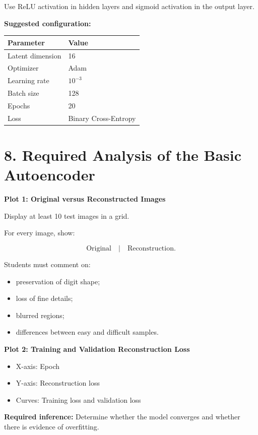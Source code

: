 \documentclass[10pt]{article}
\begin{document}
Use ReLU activation in hidden layers and sigmoid activation in the output
layer.

\textbf{Suggested configuration:}

\begin{center}
\begin{tabular}{|l|l|}
\hline
Parameter & Value\\
\hline
Latent dimension & 16\\
Optimizer & Adam\\
Learning rate & $10^{-3}$\\
Batch size & 128\\
Epochs & 20\\
Loss & Binary Cross-Entropy\\
\hline
\end{tabular}
\end{center}

\section*{8. Required Analysis of the Basic Autoencoder}

\textbf{Plot 1: Original versus Reconstructed Images}

Display at least 10 test images in a grid.

For every image, show:

\[
\text{Original}\quad|\quad\text{Reconstruction}.
\]

Students must comment on:

\begin{itemize}
\item preservation of digit shape;
\item loss of fine details;
\item blurred regions;
\item differences between easy and difficult samples.
\end{itemize}

\textbf{Plot 2: Training and Validation Reconstruction Loss}

\begin{itemize}
\item X-axis: Epoch
\item Y-axis: Reconstruction loss
\item Curves: Training loss and validation loss
\end{itemize}

\textbf{Required inference:} Determine whether the model converges and whether
there is evidence of overfitting.
\end{document}
